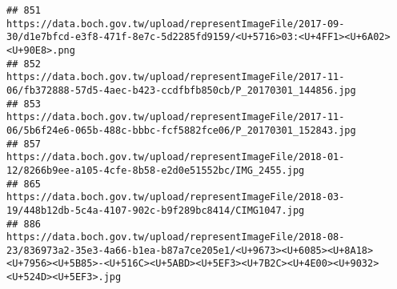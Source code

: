 \documentclass[
]{article}
\begin{document}
\begin{verbatim}
## 851                                                                                                                                                                                                                                                                                                                                                                 https://data.boch.gov.tw/upload/representImageFile/2017-09-30/d1e7bfcd-e3f8-471f-8e7c-5d2285fd9159/<U+5716>03:<U+4FF1><U+6A02><U+90E8>.png
## 852                                                                                                                                                                                                                                                                                                                                                                                   https://data.boch.gov.tw/upload/representImageFile/2017-11-06/fb372888-57d5-4aec-b423-ccdfbfb850cb/P_20170301_144856.jpg
## 853                                                                                                                                                                                                                                                                                                                                                                                   https://data.boch.gov.tw/upload/representImageFile/2017-11-06/5b6f24e6-065b-488c-bbbc-fcf5882fce06/P_20170301_152843.jpg
## 857                                                                                                                                                                                                                                                                                                                                                                                            https://data.boch.gov.tw/upload/representImageFile/2018-01-12/8266b9ee-a105-4cfe-8b58-e2d0e51552bc/IMG_2455.jpg
## 865                                                                                                                                                                                                                                                                                                                                                                                            https://data.boch.gov.tw/upload/representImageFile/2018-03-19/448b12db-5c4a-4107-902c-b9f289bc8414/CIMG1047.jpg
## 886                                                                                                                                                                                                                                                                                           https://data.boch.gov.tw/upload/representImageFile/2018-08-23/836973a2-35e3-4a66-b1ea-b87a7ce205e1/<U+9673><U+6085><U+8A18><U+7956><U+5B85>-<U+516C><U+5ABD><U+5EF3><U+7B2C><U+4E00><U+9032><U+524D><U+5EF3>.jpg

\end{verbatim}
\end{document}
